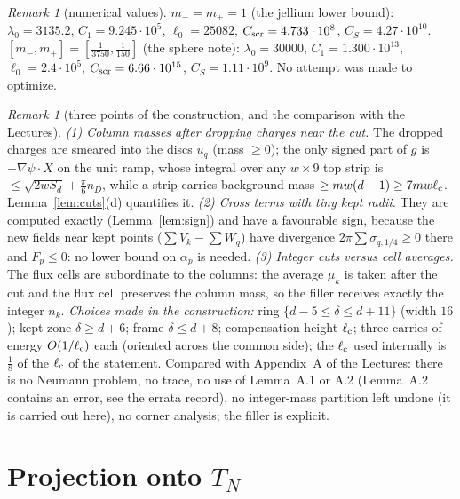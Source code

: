 \documentclass[11pt]{article}
\theoremstyle{definition}
\theoremstyle{remark}
\newtheorem{remark}[theorem]{Remark}
\newcommand{\dep}{\delta}
\newcommand{\lc}{\ell_{\rm c}}
\begin{document}
\begin{remark}[numerical values]\label{rem:numbers}
$m_-=m_+=1$ (the jellium lower bound): $\lambda_0=3135.2$, $C_1=9.245\cdot10^5$, $\ell_0=25082$, $C_{\rm scr}=4.733\cdot10^8$, $C_S=4.27\cdot10^{10}$.
$[m_-,m_+]=[\frac1{3750},\frac1{150}]$ (the sphere note): $\lambda_0=30000$, $C_1=1.300\cdot10^{13}$, $\ell_0=2.4\cdot10^5$, $C_{\rm scr}=6.66\cdot10^{15}$, $C_S=1.11\cdot10^9$.
No attempt was made to optimize.
\end{remark}

\begin{remark}[three points of the construction, and the comparison with the Lectures]\label{rem:risks}
\emph{(1) Column masses after dropping charges near the cut.} The dropped charges are smeared into the discs $u_q$ (mass $\ge0$); the only signed part of $g$ is
$-\nabla\psi\cdot X$ on the unit ramp, whose integral over any $w\times9$ top strip is $\le\sqrt{2wS_d}+\frac\pi6n_D$, while a strip carries background mass
$\ge mw(d-1)\ge7mw\lc$. Lemma~\ref{lem:cuts}(d) quantifies it. \emph{(2) Cross terms with tiny kept radii.} They are computed exactly (Lemma~\ref{lem:sign}) and have
a favourable sign, because the new fields near kept points ($\sum V_k-\sum W_q$) have divergence $2\pi\sum\sigma_{q,1/4}\ge0$ there and $F_p\le0$: no lower bound on
$\alpha_p$ is needed. \emph{(3) Integer cuts versus cell averages.} The flux cells are subordinate to the columns: the average $\mu_k$ is taken after the cut and the
flux cell preserves the column mass, so the filler receives exactly the integer $n_k$. \emph{Choices made in the construction:} ring
$\{d-5\le\dep\le d+11\}$ (width $16$); kept zone $\dep\ge d+6$; frame $\dep\le d+8$; compensation height $\lc$; three carries of energy $O(1/\lc)$ each (oriented
across the common side); the $\lc$ used internally is $\frac18$ of the $\lc$ of the statement. Compared with Appendix~A of the Lectures: there is no Neumann problem, no trace, no
use of Lemma~A.1 or A.2 (Lemma~A.2 contains an error, see the errata record), no integer-mass partition left undone (it is carried out here), no corner analysis; the filler is explicit.
\end{remark}

\section{\texorpdfstring{Projection onto $T_N$}{Projection onto T\_N}}\label{sec:projection}
\end{document}
